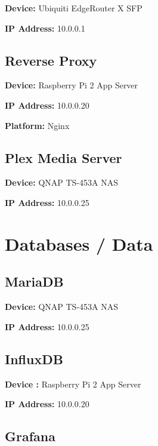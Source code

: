 \documentclass[]{article}
\begin{document}
\textbf{Device: }
{Ubiquiti EdgeRouter X SFP}

\textbf{IP Address: }
{10.0.0.1}

\subsection{\texorpdfstring{{Reverse Proxy}}{Reverse Proxy}}

\textbf{Device: }
{Raspberry Pi 2 App Server}

\textbf{IP Address: }
{10.0.0.20}

\textbf{Platform: }
{Nginx}

\subsection{\texorpdfstring{{Plex Media Server}}{Plex Media Server}}

\textbf{Device: }
{QNAP TS-453A NAS}

\textbf{IP Address: }
{10.0.0.25}


 \newpage

 \vspace{\baselineskip}\section*{Databases / Data}

\subsection{\texorpdfstring{{MariaDB}}{MariaDB}}

\textbf{Device: }
{QNAP TS-453A NAS}

\textbf{IP Address: }
{10.0.0.25}

\subsection{\texorpdfstring{{InfluxDB}}{InfluxDB}}

\textbf{Device :}
{Raspberry Pi 2 App Server}

\textbf{IP Address: }
{10.0.0.20}

\subsection{\texorpdfstring{{Grafana}}{Grafana}}
\end{document}
